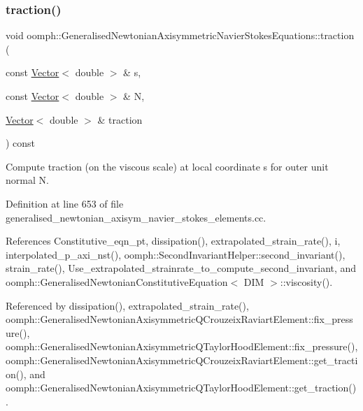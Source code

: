 \subsubsection{\texorpdfstring{traction()}{traction()}}
{\footnotesize\ttfamily void oomph\+::\+Generalised\+Newtonian\+Axisymmetric\+Navier\+Stokes\+Equations\+::traction (\begin{DoxyParamCaption}\item[{const \hyperlink{classoomph_1_1Vector}{Vector}$<$ double $>$ \&}]{s,  }\item[{const \hyperlink{classoomph_1_1Vector}{Vector}$<$ double $>$ \&}]{N,  }\item[{\hyperlink{classoomph_1_1Vector}{Vector}$<$ double $>$ \&}]{traction }\end{DoxyParamCaption}) const}



Compute traction (on the viscous scale) at local coordinate s for outer unit normal N. 



Definition at line 653 of file generalised\+\_\+newtonian\+\_\+axisym\+\_\+navier\+\_\+stokes\+\_\+elements.\+cc.



References Constitutive\+\_\+eqn\+\_\+pt, dissipation(), extrapolated\+\_\+strain\+\_\+rate(), i, interpolated\+\_\+p\+\_\+axi\+\_\+nst(), oomph\+::\+Second\+Invariant\+Helper\+::second\+\_\+invariant(), strain\+\_\+rate(), Use\+\_\+extrapolated\+\_\+strainrate\+\_\+to\+\_\+compute\+\_\+second\+\_\+invariant, and oomph\+::\+Generalised\+Newtonian\+Constitutive\+Equation$<$ D\+I\+M $>$\+::viscosity().



Referenced by dissipation(), extrapolated\+\_\+strain\+\_\+rate(), oomph\+::\+Generalised\+Newtonian\+Axisymmetric\+Q\+Crouzeix\+Raviart\+Element\+::fix\+\_\+pressure(), oomph\+::\+Generalised\+Newtonian\+Axisymmetric\+Q\+Taylor\+Hood\+Element\+::fix\+\_\+pressure(), oomph\+::\+Generalised\+Newtonian\+Axisymmetric\+Q\+Crouzeix\+Raviart\+Element\+::get\+\_\+traction(), and oomph\+::\+Generalised\+Newtonian\+Axisymmetric\+Q\+Taylor\+Hood\+Element\+::get\+\_\+traction().

\mbox{\label{classoomph_1_1GeneralisedNewtonianAxisymmetricNavierStokesEquations_a13fccddff4fd22e3c16b20a5a2227f6d}} 
